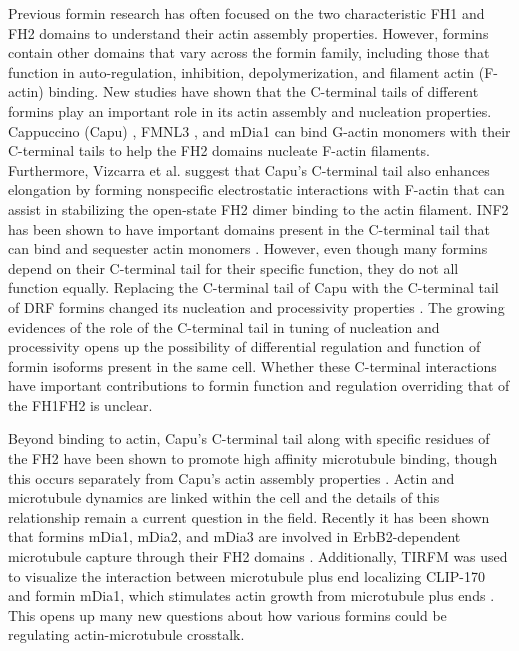 Previous formin research has often focused on the two characteristic FH1 and FH2 domains to understand their actin assembly properties. However, formins contain other domains that vary across the formin family, including those that function in auto-regulation, inhibition, depolymerization, and filament actin (F-actin) binding. New studies have shown that the C-terminal tails of different formins play an important role in its actin assembly and nucleation properties. Cappuccino (Capu) \citep{vizcarra_role_2014}, FMNL3 \citep{heimsath_c_2012}, and mDia1 \citep{gould_formin_2011} can bind G-actin monomers with their C-terminal tails to help the FH2 domains nucleate F-actin filaments. Furthermore, Vizcarra et al. suggest that Capu's C-terminal tail also enhances elongation by forming nonspecific electrostatic interactions with F-actin that can assist in stabilizing the open-state FH2 dimer binding to the actin filament. INF2 has been shown to have important domains present in the C-terminal tail that can bind and sequester actin monomers \citep{chhabra_inf2_2006}. However, even though many formins depend on their C-terminal tail for their specific function, they do not all function equally. Replacing the C-terminal tail of Capu with the C-terminal tail of DRF formins changed its nucleation and processivity properties \citep{vizcarra_role_2014}. The growing evidences of the role of the C-terminal tail in tuning of nucleation and processivity opens up the possibility of differential regulation and function of formin isoforms present in the same cell. Whether these C-terminal interactions have important contributions to formin function and regulation overriding that of the FH1FH2 is unclear. 

Beyond binding to actin, Capu's C-terminal tail along with specific residues of the FH2 have been shown to promote high affinity microtubule binding, though this occurs separately from Capu's actin assembly properties \citep{roth-johnson_interaction_2014}. Actin and microtubule dynamics are linked within the cell and the details of this relationship remain a current question in the field. Recently it has been shown that formins mDia1, mDia2, and mDia3 are involved in ErbB2-dependent microtubule capture through their FH2 domains \citep{daou_essential_2014}. Additionally, TIRFM was used to visualize the interaction between microtubule plus end localizing CLIP-170 and formin mDia1, which stimulates actin growth from microtubule plus ends \citep{henty-ridilla_accelerated_2016}. This opens up many new questions about how various formins could be regulating actin-microtubule crosstalk. 

